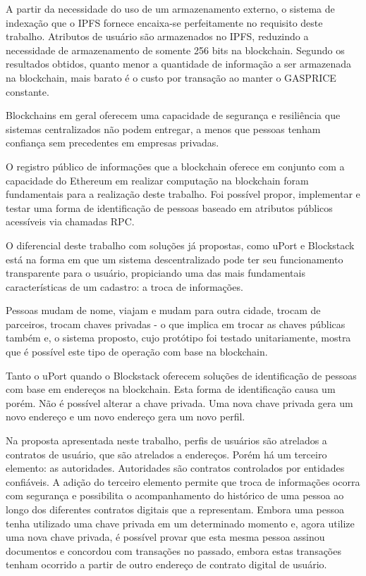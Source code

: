 \documentclass[tcc,capa]{texufpel}
\begin{document}
    A partir da necessidade do uso de um armazenamento externo, o sistema de indexação que o IPFS fornece encaixa-se perfeitamente no requisito deste trabalho. Atributos de usuário são armazenados no IPFS, reduzindo a necessidade de armazenamento de somente 256 bits na blockchain. Segundo os resultados obtidos, quanto menor a quantidade de informação a ser armazenada na blockchain, mais barato é o custo por transação ao manter o GASPRICE constante.
    
    Blockchains em geral oferecem uma capacidade de segurança e resiliência que sistemas centralizados não podem entregar, a menos que pessoas tenham confiança sem precedentes em empresas privadas.
    
    O registro público de informações que a blockchain oferece em conjunto com a capacidade do Ethereum em realizar computação na blockchain foram fundamentais para a realização deste trabalho. Foi possível propor, implementar e testar uma forma de identificação de pessoas baseado em atributos públicos acessíveis via chamadas RPC.
    
    O diferencial deste trabalho com soluções já propostas, como uPort e Blockstack está na forma em que um sistema descentralizado pode ter seu funcionamento transparente para o usuário, propiciando uma das mais fundamentais características de um cadastro: a troca de informações.
    
    Pessoas mudam de nome, viajam e mudam para outra cidade, trocam de parceiros, trocam chaves privadas - o que implica em trocar as chaves públicas também e, o sistema proposto, cujo protótipo foi testado unitariamente, mostra que é possível este tipo de operação com base na blockchain.
    
    Tanto o uPort quando o Blockstack oferecem soluções de identificação de pessoas com base em endereços na blockchain. Esta forma de identificação causa um porém. Não é possível alterar a chave privada. Uma nova chave privada gera um novo endereço e um novo endereço gera um novo perfil. 
    
    Na proposta apresentada neste trabalho, perfis de usuários são atrelados a contratos de usuário, que são atrelados a endereços. Porém há um terceiro elemento: as autoridades. Autoridades são contratos controlados por entidades confiáveis. A adição do terceiro elemento permite que troca de informações ocorra com segurança e possibilita o acompanhamento do histórico de uma pessoa ao longo dos diferentes contratos digitais que a representam. Embora uma pessoa tenha utilizado uma chave privada em um determinado momento e, agora utilize uma nova chave privada, é possível provar que esta mesma pessoa assinou documentos e concordou com transações no passado, embora estas transações tenham ocorrido a partir de outro endereço de contrato digital de usuário.
    
\end{document}
